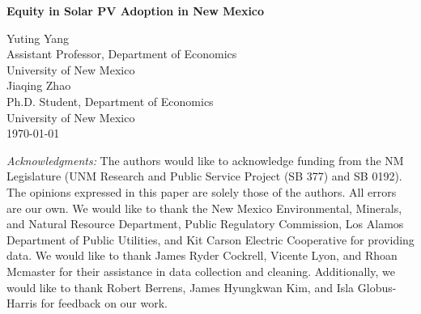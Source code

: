 \begin{titlepage}

\newcommand{\HRule}{\rule{\linewidth}{0.5mm}} %





\begin{center} %



{ \huge \bfseries Equity in Solar PV Adoption in New Mexico}\\ %
\end{center}
\vspace{1.5em}

\begin{center}
    \large
Yuting Yang\\ %
Assistant Professor, Department of Economics\\
University of New Mexico\\
\vspace{1em}
Jiaqing Zhao\\ %
Ph.D. Student, Department of Economics\\
University of New Mexico\\
\vspace{1.5em}
\today
\vspace{1.5em}
\begin{flushleft}
\normalsize

    \textit{Acknowledgments:} The authors would like to acknowledge funding from the NM Legislature (UNM Research and Public Service Project (SB 377) and SB 0192). The opinions expressed in this paper are solely those of the authors. All errors are our own. We would like to thank the New Mexico Environmental, Minerals, and Natural Resource Department, Public Regulatory Commission, Los Alamos Department of Public Utilities, and Kit Carson Electric Cooperative for providing data. We would like to thank James Ryder Cockrell, Vicente Lyon, and Rhoan Mcmaster for their assistance in data collection and cleaning. Additionally, we would like to thank Robert Berrens, James Hyungkwan Kim, and Isla Globus-Harris for feedback on our work.  \\


\end{flushleft}
\end{center}
\end{titlepage}
